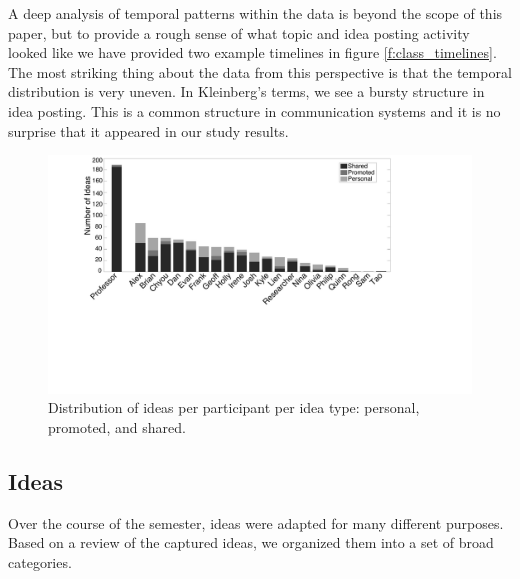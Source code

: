A deep analysis of temporal patterns within the data is beyond the scope of this paper, but to provide a rough sense of what topic and idea posting activity looked like we have provided two example timelines in figure \ref{f:class_timelines}. The most striking thing about the data from this perspective is that the temporal distribution is very uneven. In Kleinberg's terms, we see a bursty structure \citep{Kleinberg:2003ej} in idea posting. This is a common structure in communication systems and it is no surprise that it appeared in our study results. 



\begin{figure}[t]
\centering
\includegraphics{figures/tincan/ideas_per_participant.pdf}
\caption{Distribution of ideas per participant per idea type: personal, promoted, and shared.}
\label{f:ideas_per_participant}
\end{figure}





\subsection{Ideas}

Over the course of the semester, ideas were adapted for many different purposes. Based on a review of the captured ideas, we organized them into a set of broad categories.

